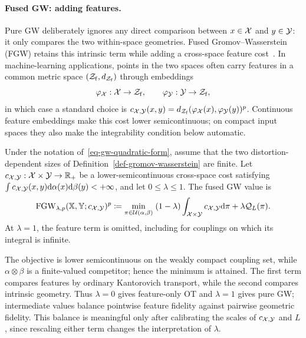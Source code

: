 \paragraph{Fused GW: adding features.}
Pure GW deliberately ignores any direct comparison between $x\in\mathcal{X}$ and $y\in\mathcal{Y}$: it only compares the two within-space geometries. Fused Gromov--Wasserstein (FGW) retains this intrinsic term while adding a cross-space feature cost~\cite{vayer2019optimaltransportstructured}. In machine-learning applications, points in the two spaces often carry features in a common metric space $(\mathcal Z_{\mathrm f},d_{\mathcal Z_{\mathrm f}})$ through embeddings
\[
	\varphi_{\mathcal{X}}:\mathcal{X}\to\mathcal Z_{\mathrm f},
	\qquad
	\varphi_{\mathcal{Y}}:\mathcal{Y}\to\mathcal Z_{\mathrm f},
\]
in which case a standard choice is
$c_{\mathcal{X},\mathcal{Y}}(x,y)=d_{\mathcal Z_{\mathrm f}}(\varphi_{\mathcal{X}}(x),\varphi_{\mathcal{Y}}(y))^p$.
Continuous feature embeddings make this cost lower semicontinuous; on compact input spaces they also make the integrability condition below automatic.

\begin{defn}\label{def-fused-gromov-wasserstein}
		Under the notation of~\eqref{eq-gw-quadratic-form}, assume that the two distortion-dependent sizes of Definition~\ref{def-gromov-wasserstein} are finite. Let
		$c_{\mathcal{X},\mathcal{Y}}:\mathcal{X}\times\mathcal{Y}\to\mathbb{R}_+$ be a lower-semicontinuous cross-space cost satisfying
		$\int c_{\mathcal{X},\mathcal{Y}}(x,y)\mathrm{d}\alpha(x)\mathrm{d}\beta(y)<+\infty$, and let $0\leq\lambda\leq1$. The fused GW value is
	\begin{equation}\label{eq-fused-gromov-wasserstein}
		\operatorname{FGW}_{\lambda,p}(\mathbb{X},\mathbb{Y};c_{\mathcal{X},\mathcal{Y}})^p
		\coloneqq
		\underset{\pi\in\mathcal{U}(\alpha,\beta)}{\min}\;
		(1-\lambda)\int_{\mathcal{X}\times\mathcal{Y}}c_{\mathcal{X},\mathcal{Y}}\mathrm{d}\pi
		+
		\lambda\mathcal Q_L(\pi).
	\end{equation}
	At $\lambda=1$, the feature term is omitted, including for couplings on which its integral is infinite.
\end{defn}
The objective is lower semicontinuous on the weakly compact coupling set, while $\alpha\otimes\beta$ is a finite-valued competitor; hence the minimum is attained. The first term compares features by ordinary Kantorovich transport, while the second compares intrinsic geometry. Thus $\lambda=0$ gives feature-only OT and $\lambda=1$ gives pure GW; intermediate values balance pointwise feature fidelity against pairwise geometric fidelity. This balance is meaningful only after calibrating the scales of $c_{\mathcal{X},\mathcal{Y}}$ and $L$, since rescaling either term changes the interpretation of $\lambda$.


